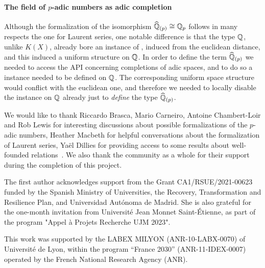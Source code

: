 \documentclass[sigplan,10pt, nonacm, review]{acmart}
\begin{document}
\paragraph{The field of $p$-adic numbers as adic completion}
Although the formalization of the isomorphism $\widehat{\mathbb{Q}}_{(p)}\cong\mathbb{Q}_p$ follows in many respects the one for Laurent series, one notable difference is that the type $\mathbb{Q}$, unlike $K(X)$, already bore an instance of , induced from the euclidean distance, and this induced a uniform structure on $\mathbb{Q}$. In order to define the term $\widehat{\mathbb{Q}}_{(p)}$ we needed to access the API concerning completions of adic spaces, and to do so a  instance needed to be defined on $\mathbb{Q}$. The corresponding uniform space structure would conflict with the euclidean one, and therefore we needed to locally disable the  instance on $\mathbb{Q}$ already just to \emph{define} the type $\widehat{\mathbb{Q}}_{(p)}$.


\begin{acks}
We would like to thank Riccardo Brasca, Mario Carneiro, Antoine Chambert-Loir and Rob Lewis for interesting discussions about possible formalizations of the $p$-adic numbers, Heather Macbeth for helpful conversations about the formalization of Laurent series, Yaël Dillies for providing access to some results about well-founded relations\ . We also thank the \mathlib community as a whole for their support during the completion of this project.

The first author acknowledges support from the Grant CA1/RSUE/2021-00623 funded by the Spanish Ministry of Universities, the Recovery, Transformation and Resilience Plan, and Universidad Autónoma de Madrid. She is also grateful for the one-month invitation from Université Jean Monnet Saint-Étienne, as part of the
program "Appel à Projets Recherche UJM 2023".


This work was supported by the LABEX MILYON (ANR-10-LABX-0070) of Université de Lyon, within the program ``France 2030'' (ANR-11-IDEX-0007) operated by the French National Research Agency (ANR).
\end{acks}





\end{document}
